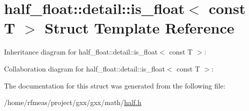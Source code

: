 \hypertarget{structhalf__float_1_1detail_1_1is__float_3_01const_01T_01_4}{}\section{half\+\_\+float\+:\+:detail\+:\+:is\+\_\+float$<$ const T $>$ Struct Template Reference}
\label{structhalf__float_1_1detail_1_1is__float_3_01const_01T_01_4}


Inheritance diagram for half\+\_\+float\+:\+:detail\+:\+:is\+\_\+float$<$ const T $>$\+:


Collaboration diagram for half\+\_\+float\+:\+:detail\+:\+:is\+\_\+float$<$ const T $>$\+:


The documentation for this struct was generated from the following file\+:\begin{DoxyCompactItemize}
\item 
/home/rfmeas/project/gxx/gxx/math/\hyperlink{half_8h}{half.\+h}\end{DoxyCompactItemize}
